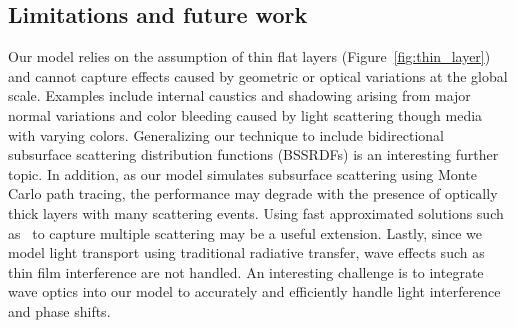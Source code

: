 \subsection{Limitations and future work}
\label{subsec:limitation}
%
Our model relies on the assumption of thin flat layers (Figure~\ref{fig:thin_layer}) and cannot capture effects caused by geometric or optical variations at the global scale.
Examples include internal caustics and shadowing arising from major normal variations and color bleeding caused by light scattering though media with varying colors.
Generalizing our technique to include bidirectional subsurface scattering distribution functions (BSSRDFs) is an interesting further topic.
In addition, as our model simulates subsurface scattering using Monte Carlo path tracing, the performance may degrade with the presence of optically thick layers with many scattering events.
Using fast approximated solutions such as~\cite{Jensen:2001:PMS,Frisvad:2014:DDM} to capture multiple scattering may be a useful extension.
Lastly, since we model light transport using traditional radiative transfer, wave effects such as thin film interference are not handled.
An interesting challenge is to integrate wave optics into our model to accurately and efficiently handle light interference and phase shifts.



